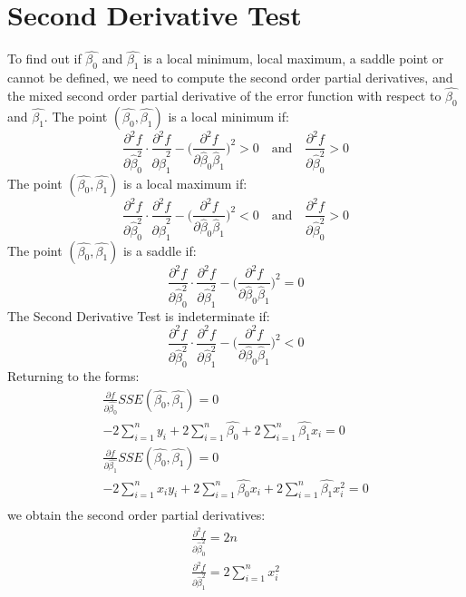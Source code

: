 \documentclass{article}
\begin{document}
\section*{Second Derivative Test}

To find out if $\hat{\beta_0}$ and $\hat{\beta_1}$ is a local minimum, local maximum, a saddle point or cannot be defined, we need to compute the second order partial derivatives, and the mixed second order partial derivative of the error function with respect to  $\hat{\beta_0}$ and $\hat{\beta_1}$. The point $(\hat{\beta_{0}}, \hat{\beta_{1}})$ is a local minimum if:
$$
\frac{\partial^2f}{\partial \hat{\beta}_{0}^2} \cdot \frac{\partial^2f}{\partial \hat{\beta}_{1}^2} - \Bigg( \frac{\partial^2f}{\partial \hat{\beta}_{0} \hat{\beta}_{1}}\Bigg)^2 > 0  \quad \textrm{and} \quad \frac{\partial^2f}{\partial \hat{\beta}_{0}^2} > 0
$$
The point $(\hat{\beta_{0}}, \hat{\beta_{1}})$ is a local maximum if:
$$
\frac{\partial^2f}{\partial \hat{\beta}_{0}^2} \cdot \frac{\partial^2f}{\partial \hat{\beta}_{1}^2} - \Bigg( \frac{\partial^2f}{\partial \hat{\beta}_{0} \hat{\beta}_{1}}\Bigg)^2 < 0  \quad \textrm{and} \quad \frac{\partial^2f}{\partial \hat{\beta}_{0}^2} > 0
$$
The point $(\hat{\beta_{0}}, \hat{\beta_{1}})$ is a saddle if:
$$
\frac{\partial^2f}{\partial \hat{\beta}_{0}^2} \cdot \frac{\partial^2f}{\partial \hat{\beta}_{1}^2} - \Bigg( \frac{\partial^2f}{\partial \hat{\beta}_{0} \hat{\beta}_{1}}\Bigg)^2 = 0 
$$
The Second Derivative Test is indeterminate if:
$$
\frac{\partial^2f}{\partial \hat{\beta}_{0}^2} \cdot \frac{\partial^2f}{\partial \hat{\beta}_{1}^2} - \Bigg( \frac{\partial^2f}{\partial \hat{\beta}_{0} \hat{\beta}_{1}}\Bigg)^2 < 0 
$$
Returning to the forms:
\begin{gather*}
\frac{\partial f}{\partial \hat{\beta_0}}SSE(\hat{\beta_0}, \hat{\beta_1}) = 0 \\
 -2\sum_{i=1}^{n}y_i  + 2\sum_{i=1}^{n}\hat{\beta_{0}} + 2\sum_{i=1}^{n}\hat{\beta_{1}}x_i  = 0 \\
 \frac{\partial f}{\partial \hat{\beta_1}}SSE(\hat{\beta_0}, \hat{\beta_1}) = 0 \\
 -2\sum_{i=1}^{n}x_i y_i + 2\sum_{i=1}^{n}\hat{\beta_{0}}x_i + 2\sum_{i=1}^{n}\hat{\beta_{1}}x_i^2 = 0 \\
\end{gather*}
we obtain the second order partial derivatives:
\begin{gather*}
\frac{\partial^2f}{\partial \hat{\beta}_{0}^2} = 2n \\
\frac{\partial^2f}{\partial \hat{\beta}_{1}^2} = 2\sum_{i=1}^{n}x_i^2 \\
\end{gather*}
\end{document}
